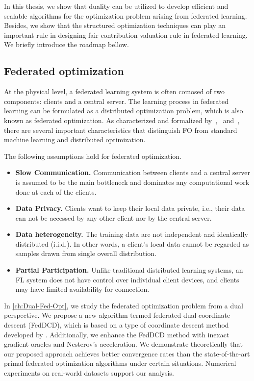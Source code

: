 In this thesis, we show that duality can be utilized to develop efficient and scalable algorithms for the optimization problem arising from federated learning. Besides, we show that the structured optimization techniques can play an important rule in designing fair contribution valuation rule in federated learning. We briefly introduce the roadmap bellow. 

\subsection{Federated optimization} \label{sec:1-4-1}

At the physical level, a federated learning system is often comosed of two components: clients and a central server. The learning process in federated learning can be formulated as a distributed optimization problem, which is also known as federated optimization. As characterized and formalized by~\citet{wang2021field},~\citet{li2020federated} and~\citet{li2019convergence}, there are several important characteristics that distinguish FO from standard machine learning and distributed optimization. 

\begin{assumption} \label{assum:govern}
The following assumptions hold for federated optimization. 
  \begin{itemize}
    \item \textbf{Slow Communication.}  Communication between clients and a central server is assumed to be the main bottleneck and dominates any computational work done at each of the clients. 
    \item \textbf{Data Privacy.} Clients want to keep their local data private, i.e., their data can not be accessed by any other client nor by the central server.
    \item \textbf{Data heterogeneity.} The training data are not independent and identically distributed (i.i.d.). In other words, a client’s local data cannot be regarded as samples drawn from single overall distribution.
    \item \textbf{Partial Participation.} Unlike traditional distributed learning systems, an FL system does not have control over individual client devices, and clients may have limited availability for connection. 
\end{itemize}
\end{assumption}

In \autoref{ch:Dual-Fed-Opt}, we study the federated optimization problem from a dual perspective. We propose a new algorithm termed federated dual coordinate descent (FedDCD), which is based on a type of coordinate descent method developed by \citet{necoara2017random}.  Additionally, we
enhance the FedDCD method with inexact gradient oracles and Nesterov's acceleration. We demonstrate
theoretically that our proposed approach achieves better convergence rates than the state-of-the-art
primal federated optimization algorithms under certain situations. Numerical experiments on real-world
datasets support our analysis.

